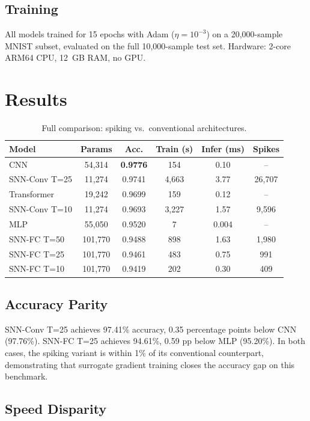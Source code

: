 \documentclass[11pt,a4paper]{article}
\begin{document}
\subsection{Training}

All models trained for 15 epochs with Adam ($\eta = 10^{-3}$) on a 20,000-sample MNIST subset, evaluated on the full 10,000-sample test set. Hardware: 2-core ARM64 CPU, 12~GB RAM, no GPU.

\section{Results}

\begin{table}[H]
\centering
\caption{Full comparison: spiking vs.\ conventional architectures.}
\label{tab:results}
\begin{tabular}{lccccc}
\toprule
\textbf{Model} & \textbf{Params} & \textbf{Acc.} & \textbf{Train (s)} & \textbf{Infer (ms)} & \textbf{Spikes} \\
\midrule
CNN & 54,314 & \textbf{0.9776} & 154 & 0.10 & -- \\
SNN-Conv T=25 & 11,274 & 0.9741 & 4,663 & 3.77 & 26,707 \\
Transformer & 19,242 & 0.9699 & 159 & 0.12 & -- \\
SNN-Conv T=10 & 11,274 & 0.9693 & 3,227 & 1.57 & 9,596 \\
MLP & 55,050 & 0.9520 & 7 & 0.004 & -- \\
SNN-FC T=50 & 101,770 & 0.9488 & 898 & 1.63 & 1,980 \\
SNN-FC T=25 & 101,770 & 0.9461 & 483 & 0.75 & 991 \\
SNN-FC T=10 & 101,770 & 0.9419 & 202 & 0.30 & 409 \\
\bottomrule
\end{tabular}
\end{table}

\subsection{Accuracy Parity}

SNN-Conv T=25 achieves 97.41\% accuracy, 0.35 percentage points below CNN (97.76\%). SNN-FC T=25 achieves 94.61\%, 0.59 pp below MLP (95.20\%). In both cases, the spiking variant is within 1\% of its conventional counterpart, demonstrating that surrogate gradient training closes the accuracy gap on this benchmark.

\subsection{Speed Disparity}
\end{document}
